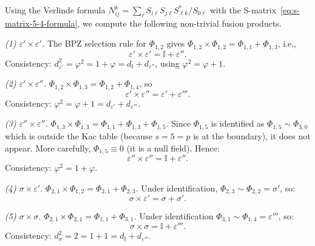 \begin{computation}\label{comp:fusion-5-4}
Using the Verlinde formula
$N_{ij}^k = \sum_{\ell} S_{i\ell}S_{j\ell}S_{\ell k}^*/S_{0\ell}$
with the S-matrix~\eqref{eq:s-matrix-5-4-formula}, we compute the following
non-trivial fusion products.

\emph{(1) $\varepsilon' \times \varepsilon'$.}
The BPZ selection rule \cite{BPZ84} for $\Phi_{1,2}$ gives
$\Phi_{1,2}\times\Phi_{1,2} = \Phi_{1,1} + \Phi_{1,3}$, i.e.,
\begin{equation}\label{eq:fusion-5-4-eps-eps}
\varepsilon' \times \varepsilon' = \mathbb{I} + \varepsilon''.
\end{equation}
Consistency: $d_{\varepsilon'}^2 = \varphi^2 = 1 + \varphi = d_{\mathbb{I}} + d_{\varepsilon''}$,
using $\varphi^2 = \varphi + 1$.

\emph{(2) $\varepsilon' \times \varepsilon''$.}
$\Phi_{1,2}\times\Phi_{1,3} = \Phi_{1,2} + \Phi_{1,4}$, so
\begin{equation}\label{eq:fusion-5-4-eps-epspp}
\varepsilon' \times \varepsilon'' = \varepsilon' + \varepsilon'''.
\end{equation}
Consistency: $\varphi^2 = \varphi + 1 = d_{\varepsilon'} + d_{\varepsilon'''}$.

\emph{(3) $\varepsilon'' \times \varepsilon''$.}
$\Phi_{1,3}\times\Phi_{1,3} = \Phi_{1,1} + \Phi_{1,3} + \Phi_{1,5}$.
Since $\Phi_{1,5}$ is identified as $\Phi_{1,5} \sim \Phi_{3,0}$ which is
outside the Kac table (because $s=5 = p$ is at the boundary), it does not appear.
More carefully, $\Phi_{1,5} \equiv 0$ (it is a null field). Hence:
\begin{equation}\label{eq:fusion-5-4-epspp-epspp}
\varepsilon'' \times \varepsilon'' = \mathbb{I} + \varepsilon''.
\end{equation}
Consistency: $\varphi^2 = 1 + \varphi$.

\emph{(4) $\sigma \times \varepsilon'$.}
$\Phi_{2,1}\times\Phi_{1,2} = \Phi_{2,1} + \Phi_{2,3}$. Under identification,
$\Phi_{2,3} \sim \Phi_{2,2} = \sigma'$, so:
\begin{equation}\label{eq:fusion-5-4-sig-eps}
\sigma \times \varepsilon' = \sigma + \sigma'.
\end{equation}

\emph{(5) $\sigma \times \sigma$.}
$\Phi_{2,1}\times\Phi_{2,1} = \Phi_{1,1} + \Phi_{3,1}$. Under identification
$\Phi_{3,1} \sim \Phi_{1,4} = \varepsilon'''$, so:
\begin{equation}\label{eq:fusion-5-4-sig-sig}
\sigma \times \sigma = \mathbb{I} + \varepsilon'''.
\end{equation}
Consistency: $d_\sigma^2 = 2 = 1 + 1 = d_{\mathbb{I}} + d_{\varepsilon'''}$.


\end{computation}
